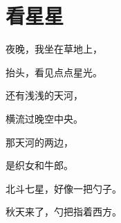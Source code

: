 \documentclass[12pt,UTF-8,openany]{ctexbook}
\begin{document}
\hanzibox{}\hanzibox{}\hanzibox{}\hanzibox{}\hspace{1em}\hanzibox{}\hanzibox{}\hanzibox{}\hanzibox{}

\hanzibox{}\hanzibox{}\hanzibox{}\hanzibox{}\hspace{1em}\hanzibox{}\hanzibox{}\hanzibox{}\hanzibox{}






\chapter{看星星}

\begin{large}
    
    夜晚，我坐在草地上，
    
    抬头，看见点点星光。
    
    还有浅浅的天河，
    
    横流过晚空中央。
    
    那天河的两边，
    
    是织女和牛郎。
    
    北斗七星，好像一把勺子。
    
    秋天来了，勺把指着西方。
    
\end{large}


\clearpage

\begin{center}
    
    
\end{center}


\hanzibox{}\hanzibox{}\hanzibox{}\hanzibox{}\hspace{1em}\hanzibox{}\hanzibox{}\hanzibox{}\hanzibox{}

\hanzibox{}\hanzibox{}\hanzibox{}\hanzibox{}\hspace{1em}\hanzibox{}\hanzibox{}\hanzibox{}\hanzibox{}

\hanzibox{}\hanzibox{}\hanzibox{}\hanzibox{}\hspace{1em}\hanzibox{}\hanzibox{}\hanzibox{}\hanzibox{}

\hanzibox{}\hanzibox{}\hanzibox{}\hanzibox{}\hspace{1em}\hanzibox{}\hanzibox{}\hanzibox{}\hanzibox{}
\end{document}

